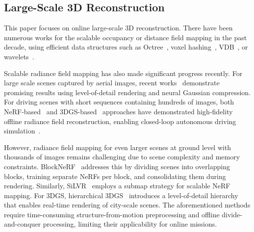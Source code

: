 \subsection{Large-Scale 3D Reconstruction}
\label{subsec:large_scale_3d_reconstruction}

This paper focuses on online large-scale 3D reconstruction.
%
There have been numerous works for the scalable occupancy or distance field mapping in the past decade, using efficient data structures such as Octree~\cite{hornung2013ar, zhong2023icra}, voxel hashing~\cite{klingensmith2015rss, oleynikova2017iros, zhong2024cvpr},  VDB~\cite{vizzo2022sensors, wu2024ral-vdbgpdf}, or wavelets~\cite{reijgwart2023rss-wavemap}.
%

Scalable radiance field mapping has also made significant progress recently.
%
For large scale scenes captured by aerial images, recent works~\cite{lu2024cvpr-scaffoldgs, ren2024arxiv-octreegs, liu2024eccv-citygaussian} demonstrate promising results using level-of-detail rendering and neural Gaussian compression.
%
For driving scenes with short sequences containing hundreds of images, both NeRF-based~\cite{rematas2022cvpr, yang2023cvpr-unisim} and 3DGS-based~\cite{zhou2024cvpr-drivinggs, yan2024eccv-streetgs, zhao2024eccv-tclcgs, fischer2024neurips-dgf, chen2024arxiv-omnire, hess2024arxiv-splatad} approaches have demonstrated high-fidelity offline radiance field reconstruction, enabling closed-loop autonomous driving simulation~\cite{yang2023cvpr-unisim, chen2024arxiv-omnire}.
%

%
However, radiance field mapping for even larger scenes at ground level with thousands of images remains challenging due to scene complexity and memory constraints.
%
\mbox{BlockNeRF}~\cite{tancik2022cvpr-blocknerf} addresses this by dividing scenes into overlapping blocks, training separate NeRFs per block, and consolidating them during rendering. 
%
Similarly, SiLVR~\cite{tao2024icra-silvr} employs a submap strategy for scalable NeRF mapping.
%
For 3DGS, hierarchical 3DGS~\cite{kerbl2024tog-hierarchical3dgs} introduces a level-of-detail hierarchy that enables real-time rendering of city-scale scenes. 
%
The aforementioned methods require time-consuming structure-from-motion preprocessing and offline divide-and-conquer processing, limiting their applicability for online missions. 
%

